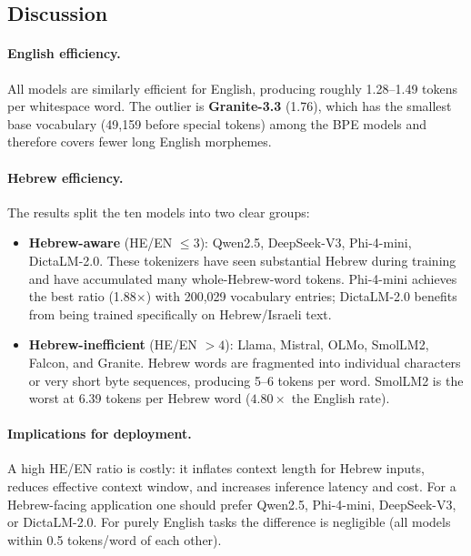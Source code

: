 \documentclass[11pt, a4paper]{article}
\begin{document}
\subsection{Discussion}

\paragraph{English efficiency.}
All models are similarly efficient for English, producing roughly 1.28--1.49
tokens per whitespace word.  The outlier is \textbf{Granite-3.3} (1.76), which
has the smallest base vocabulary (49{,}159 before special tokens) among
the BPE models and therefore covers fewer long English morphemes.

\paragraph{Hebrew efficiency.}
The results split the ten models into two clear groups:

\begin{itemize}[noitemsep]
  \item \textbf{Hebrew-aware} (HE/EN $\leq 3$): Qwen2.5, DeepSeek-V3, Phi-4-mini,
        DictaLM-2.0. These tokenizers have seen substantial Hebrew during
        training and have accumulated many whole-Hebrew-word tokens.
        Phi-4-mini achieves the best ratio (1.88$\times$) with 200{,}029
        vocabulary entries; DictaLM-2.0 benefits from being trained
        specifically on Hebrew/Israeli text.
  \item \textbf{Hebrew-inefficient} (HE/EN $> 4$): Llama, Mistral, OLMo,
        SmolLM2, Falcon, and Granite.  Hebrew words are fragmented into
        individual characters or very short byte sequences, producing 5--6
        tokens per word.  SmolLM2 is the worst at 6.39 tokens per Hebrew word
        ($4.80\times$ the English rate).
\end{itemize}

\paragraph{Implications for deployment.}
A high HE/EN ratio is costly: it inflates context length for Hebrew inputs,
reduces effective context window, and increases inference latency and cost.
For a Hebrew-facing application one should prefer Qwen2.5, Phi-4-mini,
DeepSeek-V3, or DictaLM-2.0.  For purely English tasks the difference is
negligible (all models within 0.5 tokens/word of each other).
\end{document}
